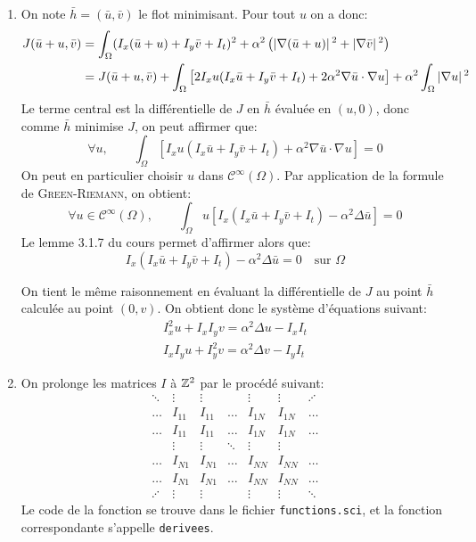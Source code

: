 \begin{enumerate}[questions]
\item On note $\bar{h} = (\bar{u}, \bar{v})$ le flot minimisant. Pour tout $u$ on a donc:
\begin{align*}
J(\bar{u}+u, \bar{v}) &= \int_{\Omega} (I_x(\bar{u}+u) + I_y\bar{v} + I_t)^2 + \alpha^2\left( \abs{\nabla (\bar{u}+u)}^2 + \abs{\nabla \bar{v}}^2 \right) \\
&= J(\bar{u}+u, \bar{v}) + \int_\Omega \left[2 I_x u(I_x\bar{u} + I_y\bar{v} + I_t) + 2\alpha^2 \nabla\bar{u} \cdot \nabla u\right] + \alpha^2 \int_\Omega \abs{\nabla u}^2
\end{align*}
Le terme central est la différentielle de $J$ en $\bar{h}$ évaluée en $(u, 0)$, donc comme $\bar{h}$ minimise $J$, on peut affirmer que:
\[ \forall u, \qquad \int_\Omega \left[I_x u(I_x\bar{u} + I_y\bar{v} + I_t) + \alpha^2 \nabla\bar{u} \cdot \nabla u\right] = 0 \]
On peut en particulier choisir $u$ dans $\mathscr{C}^\infty(\Omega)$. Par application de la formule de \textsc{Green-Riemann}, on obtient:
\[ \forall u \in \mathscr{C}^\infty(\Omega), \qquad \int_\Omega u\left[I_x(I_x\bar{u} + I_y\bar{v} + I_t) - \alpha^2 \Delta\bar{u} \right] = 0 \]
Le lemme 3.1.7 du cours permet d'affirmer alors que:
\[ I_x(I_x\bar{u} + I_y\bar{v} + I_t) - \alpha^2 \Delta\bar{u} = 0 \quad \text{sur } \Omega \]

On tient le même raisonnement en évaluant la différentielle de $J$ au point $\bar{h}$ calculée au point $(0, v)$. On obtient donc le système d'équations suivant:
\begin{gather}
I_x^2 u + I_xI_y v = \alpha^2 \Delta u - I_xI_t \label{eq:uDomin} \\
I_xI_y u + I_y^2 v = \alpha^2 \Delta v - I_yI_t \label{eq:vDomin}
\end{gather}

\item On \og{}prolonge\fg{} les matrices $I$ à $\mathbb{Z}^2$ par le procédé suivant:
	\[ \begin{array}{cc|ccc|cc}
	\ddots & \vdots & \vdots & & \vdots & \vdots & \iddots \\
	\dots & I_{11} & I_{11} & \dots & I_{1N} & I_{1N} & \dots \\ \hline
	\dots & I_{11} & I_{11} & \dots & I_{1N} & I_{1N} & \dots \\
	 & \vdots & \vdots & \ddots & \vdots & \vdots &  \\
	\dots & I_{N1} & I_{N1} & \dots & I_{NN} & I_{NN} & \dots \\ \hline
	\dots & I_{N1} & I_{N1} & \dots & I_{NN} & I_{NN} & \dots \\
	\iddots & \vdots & \vdots & & \vdots & \vdots & \ddots
	\end{array} \]
Le code de la fonction se trouve dans le fichier \verb|functions.sci|, et la fonction correspondante s'appelle \verb|derivees|.


\end{enumerate}
